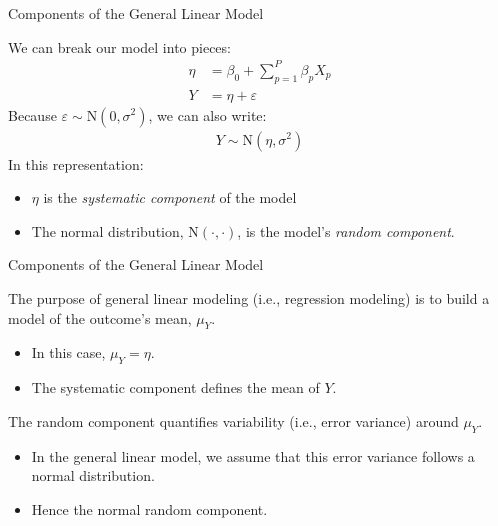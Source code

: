 \documentclass{beamer}\usepackage[]{graphicx}\usepackage[]{color}
\begin{document}
\begin{frame}{Components of the General Linear Model}
 
  We can break our model into pieces:
  \begin{align*}
    \eta &= \beta_0 + \sum_{p = 1}^P \beta_p X_p\\
    Y &= \eta + \varepsilon
  \end{align*}
  Because $\varepsilon \sim \text{N}(0, \sigma^2)$, we can also write:
  \begin{align*}
    Y \sim \text{N}(\eta, \sigma^2)
  \end{align*}
  In this representation:
  \begin{itemize}
  \item $\eta$ is the \emph{systematic component} of the model
  \item The normal distribution, $\text{N}(\cdot, \cdot)$, is the model's 
    \emph{random component}.
  \end{itemize}
  
\end{frame}


\begin{frame}{Components of the General Linear Model}
  
  The purpose of general linear modeling (i.e., regression modeling) is to build
  a model of the outcome's mean, $\mu_Y$.  
  \begin{itemize}
  \item In this case, $\mu_Y = \eta$.
  \item The systematic component defines the mean of $Y$.
  \end{itemize}
  \vb
  The random component quantifies variability (i.e., error variance) around
  $\mu_Y$.  
  \begin{itemize}
  \item In the general linear model, we assume that this error variance follows
    a normal distribution.
  \item Hence the normal random component.
  \end{itemize}
  
\end{frame}

\end{document}
